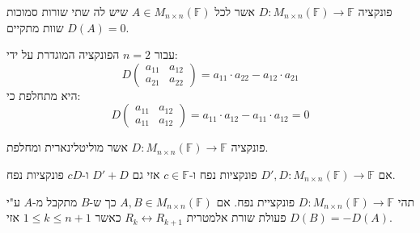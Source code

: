 \documentclass{tstextbook}
\begin{document}
\begin{definition}
פונקציה \(D:M_{n\times n}\left( \mathbb{F}  \right)\to \mathbb{F}\) אשר לכל \(A \in M_{n\times n}\left( \mathbb{F}  \right)\) שיש לה שתי שורות סמוכות שוות מתקיים \(D(A)=0\).

\end{definition}
\begin{example}
עבור \(n=2\) הפונקציה המוגדרת על ידי:
$$D\begin{pmatrix}a_{11} & a_{12} \\a_{21} & a_{22}
\end{pmatrix}=a_{11}\cdot a_{22}-a_{12}\cdot a_{21}$$
היא מתחלפת כי:
$$D\begin{pmatrix}a_{11} & a_{12} \\a_{11} & a_{12}
\end{pmatrix}=a_{11}\cdot a_{12}-a_{11}\cdot a_{12}=0$$

\end{example}
\begin{definition}
פונקציה \(D:M_{n\times n}\left( \mathbb{F}  \right)\to \mathbb{F}\) אשר מוליטלינארית ומחלפת.

\end{definition}
\begin{corollary}
אם \(D',D:M_{n\times n}\left( \mathbb{F}  \right)\to \mathbb{F}\) פונקציות נפח ו-\(c \in \mathbb{F}\) אזי גם \(D'+D\) ו-\(cD\) פונקציות נפח.

\end{corollary}
\begin{proposition}
תהי \(D:M_{n\times n}\left( \mathbb{F}  \right)\to \mathbb{F}\) פונקציית נפח. אם \(A,B \in M_{n\times n}\left( \mathbb{F}  \right)\) כך ש-\(B\) מתקבל מ-\(A\) ע"י פעולת שורת אלמטרית \(R_{k}\leftrightarrow R_{k+1}\) כאשר \(1\leq k\leq n+1\) אזי \(D(B)=-D(A)\).

\end{proposition}
\end{document}
